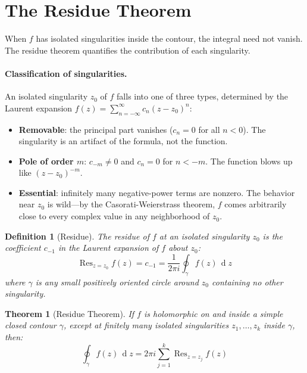 \documentclass[12pt,a4paper]{report}
\DeclareMathOperator{\deriv}{d}
\theoremstyle{thms}
\newtheorem{theorem}{Theorem}[section]
\theoremstyle{defns}
\newtheorem{definition}{Definition}[section]
\begin{document}
\section{The Residue Theorem}
\label{sec:residue}

When $f$ has isolated singularities inside the contour, the integral need not vanish. The residue theorem quantifies the contribution of each singularity.

\paragraph{Classification of singularities.} An isolated singularity $z_0$ of $f$ falls into one of three types, determined by the Laurent expansion $f(z) = \sum_{n=-\infty}^{\infty} c_n(z - z_0)^n$:
\begin{itemize}
    \item \textbf{Removable}: the principal part vanishes ($c_n = 0$ for all $n < 0$). The singularity is an artifact of the formula, not the function.
    \item \textbf{Pole of order $m$}: $c_{-m} \neq 0$ and $c_n = 0$ for $n < -m$. The function blows up like $(z - z_0)^{-m}$.
    \item \textbf{Essential}: infinitely many negative-power terms are nonzero. The behavior near $z_0$ is wild—by the Casorati-Weierstrass theorem, $f$ comes arbitrarily close to every complex value in any neighborhood of $z_0$.
\end{itemize}

\begin{definition}[Residue]
    The \textit{residue} of $f$ at an isolated singularity $z_0$ is the coefficient $c_{-1}$ in the Laurent expansion of $f$ about $z_0$:
    \begin{equation}
        \operatorname{Res}_{z = z_0} f(z) = c_{-1} = \dfrac{1}{2\pi i}\oint_\gamma f(z)\,\deriv{z}
    \end{equation}
    where $\gamma$ is any small positively oriented circle around $z_0$ containing no other singularity.
\end{definition}

\begin{theorem}[Residue Theorem]
    If $f$ is holomorphic on and inside a simple closed contour $\gamma$, except at finitely many isolated singularities $z_1, \ldots, z_k$ inside $\gamma$, then:
    \begin{equation}
        \oint_\gamma f(z)\,\deriv{z} = 2\pi i \sum_{j=1}^{k} \operatorname{Res}_{z = z_j} f(z)
    \end{equation}
    \label{thm:residue}
\end{theorem}
\end{document}
